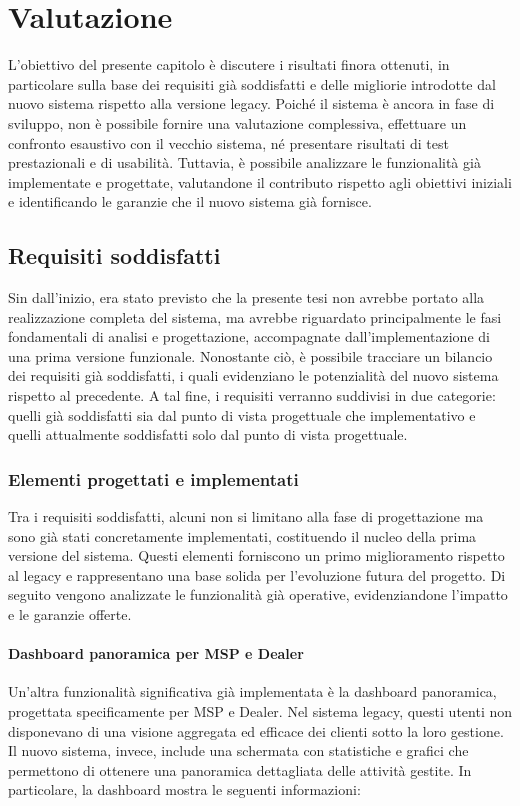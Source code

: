 \chapter{Valutazione}

L'obiettivo del presente capitolo è discutere i risultati finora ottenuti, in particolare sulla base dei requisiti già soddisfatti e delle migliorie introdotte dal nuovo sistema rispetto alla versione legacy. Poiché il sistema è ancora in fase di sviluppo, non è possibile fornire una valutazione complessiva, effettuare un confronto esaustivo con il vecchio sistema, né presentare risultati di test prestazionali e di usabilità. Tuttavia, è possibile analizzare le funzionalità già implementate e progettate, valutandone il contributo rispetto agli obiettivi iniziali e identificando le garanzie che il nuovo sistema già fornisce.

\section{Requisiti soddisfatti}
Sin dall'inizio, era stato previsto che la presente tesi non avrebbe portato alla realizzazione completa del sistema, ma avrebbe riguardato principalmente le fasi fondamentali di analisi e progettazione, accompagnate dall'implementazione di una prima versione funzionale. Nonostante ciò, è possibile tracciare un bilancio dei requisiti già soddisfatti, i quali evidenziano le potenzialità del nuovo sistema rispetto al precedente. A tal fine, i requisiti verranno suddivisi in due categorie: quelli già soddisfatti sia dal punto di vista progettuale che implementativo e quelli attualmente soddisfatti solo dal punto di vista progettuale.

\subsection{Elementi progettati e implementati}
Tra i requisiti soddisfatti, alcuni non si limitano alla fase di progettazione ma sono già stati concretamente implementati, costituendo il nucleo della prima versione del sistema. Questi elementi forniscono un primo miglioramento rispetto al legacy e rappresentano una base solida per l’evoluzione futura del progetto. Di seguito vengono analizzate le funzionalità già operative, evidenziandone l'impatto e le garanzie offerte.

\subsubsection{Dashboard panoramica per MSP e Dealer}
Un'altra funzionalità significativa già implementata è la dashboard panoramica, progettata specificamente per MSP e Dealer. Nel sistema legacy, questi utenti non disponevano di una visione aggregata ed efficace dei clienti sotto la loro gestione. Il nuovo sistema, invece, include una schermata con statistiche e grafici che permettono di ottenere una panoramica dettagliata delle attività gestite. In particolare, la dashboard mostra le seguenti informazioni:

